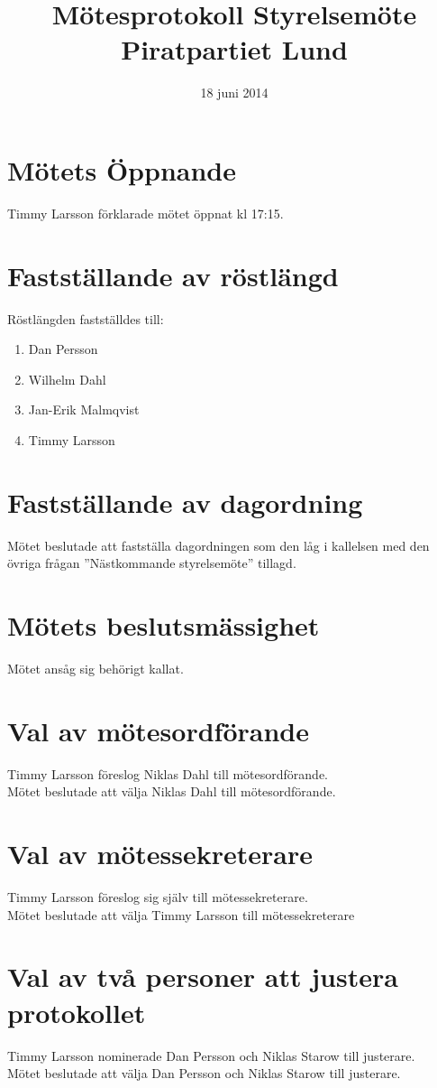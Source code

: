 \documentclass[a4paper,10pt]{article}
\title{\vspace{-1.5in}\textmd{\textbf{Mötesprotokoll Styrelsemöte Piratpartiet Lund}}}
\date{18 juni 2014}
\author{}
\begin{document}
\maketitle

\section{Mötets Öppnande}
Timmy Larsson förklarade mötet öppnat kl 17:15.

\section{Fastställande av röstlängd}
Röstlängden fastställdes till:
\begin{enumerate}
\item Dan Persson
\item Wilhelm Dahl
\item Jan-Erik Malmqvist
\item Timmy Larsson
\end{enumerate}

\section{Fastställande av dagordning}
Mötet beslutade att fastställa dagordningen som den låg i kallelsen med den övriga frågan ''Nästkommande styrelsemöte'' tillagd.

\section{Mötets beslutsmässighet}
Mötet ansåg sig behörigt kallat.

\newpage

\section{Val av mötesordförande}
Timmy Larsson föreslog Niklas Dahl till mötesordförande.\\
Mötet beslutade att välja Niklas Dahl till mötesordförande.

\section{Val av mötessekreterare}
Timmy Larsson föreslog sig själv till mötessekreterare.\\
Mötet beslutade att välja Timmy Larsson till mötessekreterare

\section{Val av två personer att justera protokollet}
Timmy Larsson nominerade Dan Persson och Niklas Starow till justerare.\\
Mötet beslutade att välja Dan Persson och Niklas Starow till justerare.
\end{document}
